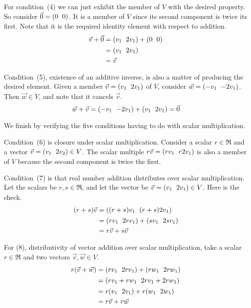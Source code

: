 \documentclass[10pt,t]{beamer}
\begin{document}
\begin{frame}
\pause
For condition~(4) we can just exhibit the member of $V$ with the desired 
property. 
So consider $\zero=\rowvec{0 &0}$.
It is a member of $V$ since its second component is twice its first.
Note that it is the required identity element with respect to addition. 
\begin{align*}
  \vec{v}+\zero
  &=\rowvec{v_1 &2v_1}+\rowvec{0  &0}     \\
  &=\rowvec{v_1 &2v_1}    \\
  &=\vec{v}
\end{align*}
\end{frame}\begin{frame}
Condition~(5), existence of an additive inverse, is also a matter of 
producing the desired element.
Given a member $\vec{v}=\rowvec{v_1 &2v_1}$ of $V$, consider
$\vec{w}=\rowvec{-v_1 &-2v_1}$.
Then $\vec{w}\in V$, and note that it cancels $\vec{v}$.
\begin{equation*}
  \vec{w}+\vec{v}=\rowvec{-v_1 &-2v_1}+\rowvec{v_1 &2v_1}=\zero
\end{equation*}

\pause
We finish by verifying the five conditions having to do with scalar multiplication.


Condition~(6) is closure under scalar multiplication.
Consider a scalar $r\in\Re$ and a vector $\vec{v}=\rowvec{v_1 &2v_2}\in V$.
The scalar multiple $r\vec{v}=\rowvec{rv_1 &r2v_1}$ is also a member
of $V$ because the second component is twice the first.

\pause
Condition~(7) is that 
real number addition distributes over scalar multiplication.
Let the scalars be $r,s\in\Re$, and 
let the vector be $\vec{v}=\rowvec{v_1 &2v_1}\in V$.
Here is the check.
\begin{align*}
  (r+s)\vec{v} &= \rowvec{(r+s)v_1 &(r+s)2v_1}               \\
               &=\rowvec{rv_1 &2rv_1}+\rowvec{sv_1 &2sv_1}   \\
               &=r\vec{v}+s\vec{v}
\end{align*}
\end{frame}\begin{frame}
For (8),
distributivity of vector addition over scalar multiplication,
take a scalar $r\in\Re$ and 
two vectors $\vec{v},\vec{w}\in V$.
\begin{align*}
  r(\vec{v}+\vec{w}) &=\rowvec{rv_1 &2rv_1}+\rowvec{rw_1 &2rw_1}   \\
                     &=\rowvec{rv_1+rw_1 &2rv_1+2rw_1}           \\
                     &=r\rowvec{v_1 &2v_1}+r\rowvec{w_1 &2w_1}   \\
                     &=r\vec{v}+r\vec{w}
\end{align*}


\end{frame}
\end{document}
